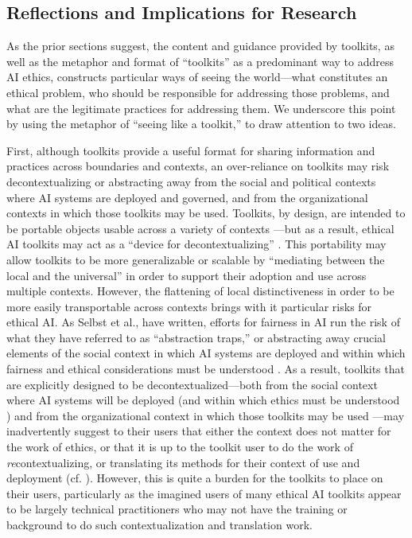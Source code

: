 \documentclass[acmsmall]{acmart}
\begin{document}
\subsection{Reflections and Implications for Research} 
As the prior sections suggest, the content and guidance provided by toolkits, as well as the metaphor and format of ``toolkits'' as a predominant way to address AI ethics, constructs particular ways of seeing the world---what constitutes an ethical problem, who should be responsible for addressing those problems, and what are the legitimate practices for addressing them. We underscore this point by using the metaphor of ``seeing like a toolkit,'' to draw attention to two ideas. 

First, although toolkits provide a useful format for sharing information and practices across boundaries and contexts, an over-reliance on toolkits may risk decontextualizing or abstracting away from the social and political contexts where AI systems are deployed and governed, and from the organizational contexts in which those toolkits may be used. Toolkits, by design, are intended to be portable objects usable across a variety of contexts \cite{mattern_2021, kelty_2018}---but as a result, ethical AI toolkits may act as a ``device for decontextualizing'' \cite{kelty_2018}. This portability may allow toolkits to be more generalizable or scalable by ``mediating between the local and the universal'' \cite{mattern_2021} in order to support their adoption and use across multiple contexts. However, the flattening of local distinctiveness in order to be more easily transportable across contexts \cite{redfield2013life} brings with it particular risks for ethical AI. As Selbst et al., have written, efforts for fairness in AI run the risk of what they have referred to as ``abstraction traps,'' or abstracting away crucial elements of the social context in which AI systems are deployed and within which fairness and ethical considerations must be understood \cite{selbst2019fairness}. As a result, toolkits that are explicitly designed to be decontextualized---both from the social context where AI systems will be deployed (and within which ethics must be understood \cite{sambasivan2021reimagining}) and from the organizational context in which those toolkits may be used \cite{suchman2002located}---may inadvertently suggest to their users that either the context does not matter for the work of ethics, or that it is up to the toolkit user to do the work of \textit{re}contextualizing, or translating its methods for their context of use and deployment (cf. \cite{morley2021initial}). However, this is quite a burden for the toolkits to place on their users, particularly as the imagined users of many ethical AI toolkits appear to be largely technical practitioners who may not have the training or background to do such contextualization and translation work.
\end{document}
